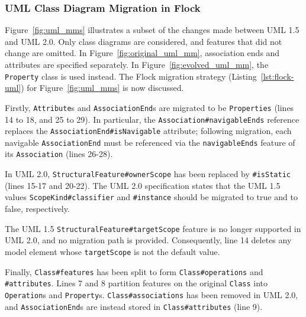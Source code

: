 \subsubsection{UML Class Diagram Migration in Flock}
Figure~\ref{fig:uml_mms} illustrates a subset of the changes made between UML 1.5 and UML 2.0. Only class diagrams are considered, and features that did not change are omitted. In Figure~\ref{fig:original_uml_mm}, association ends and attributes are specified separately. In Figure~\ref{fig:evolved_uml_mm}, the \texttt{Pr\-op\-er\-ty} class is used instead. The Flock migration strategy (Listing~\ref{lst:flock-uml}) for Figure~\ref{fig:uml_mms} is now discussed.

Firstly, \texttt{At\-tr\-ib\-ut\-e}s and \texttt{As\-so\-ci\-at\-i\-onEn\-d}s are migrated to be \texttt{Pr\-o\-pe\-rt\-ies} (lines 14 to 18, and 25 to 29). In particular, the \texttt{As\-so\-ci\-at\-i\-on\#na\-vi\-ga\-b\-leEn\-ds} reference replaces the \texttt{As\-so\-ci\-at\-i\-onE\-nd\#isN\-av\-ig\-ab\-le} attribute; following migration, each navigable \texttt{As\-so\-ci\-at\-i\-onE\-nd} must be referenced via the \texttt{na\-vi\-ga\-bl\-eEn\-ds} feature of its \texttt{As\-so\-ci\-at\-ion} (lines 26-28).

In UML 2.0, \texttt{St\-ru\-ct\-ur\-alFe\-at\-ur\-e\#o\-wn\-er\-Sc\-op\-e} has been replaced by \texttt{\#i\-sS\-ta\-ti\-c} (lines 15-17 and 20-22). The UML 2.0 specification states that the UML 1.5 values \texttt{Sc\-op\-eKi\-nd\#cl\-as\-si\-fi\-er} and \texttt{\#i\-ns\-ta\-nce} should be migrated to true and to false, respectively. 

The UML 1.5 \texttt{St\-ru\-ct\-ur\-alFe\-at\-ur\-e\#t\-ar\-g\-et\-Sc\-op\-e} feature is no longer supported in UML 2.0, and no migration path is provided. Consequently, line 14 deletes any model element whose \texttt{t\-ar\-g\-et\-Sc\-op\-e} is not the default value.

Finally, \texttt{C\-la\-ss\#fe\-at\-ur\-es} has been split to form \texttt{C\-la\-ss\#op\-er\-at\-io\-ns} and \texttt{\#at\-tr\-ib\-ut\-es}. Lines 7 and 8 partition features on the original \texttt{Cl\-a\-ss} into \texttt{Op\-er\-at\-io\-n}s and \texttt{Pr\-op\-er\-ty}s. \texttt{Cl\-as\-s\#a\-ss\-oc\-ia\-ti\-on\-s} has been removed in UML 2.0, and \texttt{As\-so\-ci\-at\-i\-onEn\-d}s are instead stored in \texttt{Cl\-a\-ss\#at\-tr\-ib\-ut\-es} (line 9).


